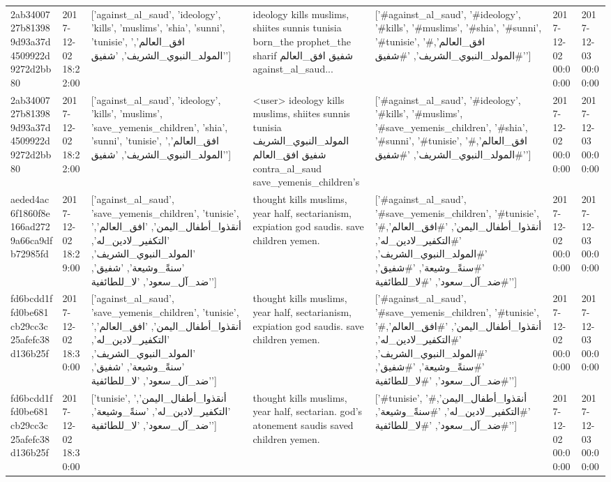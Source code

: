 \begin{tabular}{lllllll}
2ab3400727b813989d93a37d4509922d9272d2bb80 & 2017-12-02 18:22:00 & ['against_al_saud', 'ideology', 'kills', 'muslims', 'shia', 'sunni', 'tunisie', 'افق_العالم', 'المولد_النبوي_الشريف', 'شفيق'] & ideology kills muslims, shiites sunnis tunisia born\_the prophet\_the sharif شفيق افق\_العالم against\_al\_saud... & ['#against_al_saud', '#ideology', '#kills', '#muslims', '#shia', '#sunni', '#tunisie', '#افق_العالم', '#المولد_النبوي_الشريف', '#شفيق'] & 2017-12-02 00:00:00 & 2017-12-03 00:00:00 \\
2ab3400727b813989d93a37d4509922d9272d2bb80 & 2017-12-02 18:22:00 & ['against_al_saud', 'ideology', 'kills', 'muslims', 'save_yemenis_children', 'shia', 'sunni', 'tunisie', 'افق_العالم', 'المولد_النبوي_الشريف', 'شفيق'] & <user> ideology kills muslims, shiites sunnis tunisia المولد\_النبوي\_الشريف شفيق افق\_العالم contra\_al\_saud save\_yemenis\_children's & ['#against_al_saud', '#ideology', '#kills', '#muslims', '#save_yemenis_children', '#shia', '#sunni', '#tunisie', '#افق_العالم', '#المولد_النبوي_الشريف', '#شفيق'] & 2017-12-02 00:00:00 & 2017-12-03 00:00:00 \\
aeded4ac6f1860f8e166ad2729a66ca9dfb72985fd & 2017-12-02 18:29:00 & ['against_al_saud', 'save_yemenis_children', 'tunisie', 'أنقذوا_أطفال_اليمن', 'افق_العالم', 'التكفير_لادين_له', 'المولد_النبوي_الشريف', 'سنةً_وشيعة', 'شفيق', 'ضد_آل_سعود', 'لا_للطائفية'] & thought kills muslims, year half, sectarianism, expiation god saudis. save children yemen. & ['#against_al_saud', '#save_yemenis_children', '#tunisie', '#أنقذوا_أطفال_اليمن', '#افق_العالم', '#التكفير_لادين_له', '#المولد_النبوي_الشريف', '#سنةً_وشيعة', '#شفيق', '#ضد_آل_سعود', '#لا_للطائفية'] & 2017-12-02 00:00:00 & 2017-12-03 00:00:00 \\
fd6bcdd1ffd0be681cb29cc3c25afefc38d136b25f & 2017-12-02 18:30:00 & ['against_al_saud', 'save_yemenis_children', 'tunisie', 'أنقذوا_أطفال_اليمن', 'افق_العالم', 'التكفير_لادين_له', 'المولد_النبوي_الشريف', 'سنةً_وشيعة', 'شفيق', 'ضد_آل_سعود', 'لا_للطائفية'] & thought kills muslims, year half, sectarianism, expiation god saudis. save children yemen. & ['#against_al_saud', '#save_yemenis_children', '#tunisie', '#أنقذوا_أطفال_اليمن', '#افق_العالم', '#التكفير_لادين_له', '#المولد_النبوي_الشريف', '#سنةً_وشيعة', '#شفيق', '#ضد_آل_سعود', '#لا_للطائفية'] & 2017-12-02 00:00:00 & 2017-12-03 00:00:00 \\
fd6bcdd1ffd0be681cb29cc3c25afefc38d136b25f & 2017-12-02 18:30:00 & ['tunisie', 'أنقذوا_أطفال_اليمن', 'التكفير_لادين_له', 'سنةً_وشيعة', 'ضد_آل_سعود', 'لا_للطائفية'] & thought kills muslims, year half, sectarian. god's atonement saudis saved children yemen. & ['#tunisie', '#أنقذوا_أطفال_اليمن', '#التكفير_لادين_له', '#سنةً_وشيعة', '#ضد_آل_سعود', '#لا_للطائفية'] & 2017-12-02 00:00:00 & 2017-12-03 00:00:00 \\

\end{tabular}
